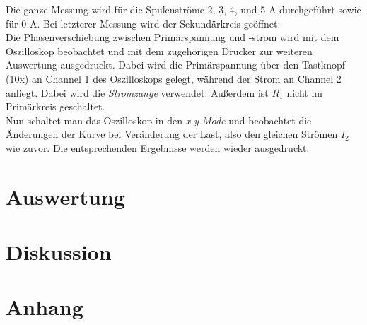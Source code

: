 \documentclass[12pt,a4paper,titlepage,headinclude,bibtotoc]{scrartcl}
\begin{document}
Die ganze Messung wird für die Spulenströme 2, 3, 4, und 5 A durchgeführt sowie für 0 A.
Bei letzterer Messung wird der Sekundärkreis geöffnet.\\
Die Phasenverschiebung zwischen Primärspannung und -strom wird mit dem Oszilloskop beobachtet und mit dem zugehörigen Drucker zur weiteren Auswertung ausgedruckt.
Dabei wird die Primärspannung über den Tastknopf (10x) an Channel 1 des Oszilloskops gelegt, während der Strom an Channel 2 anliegt.
Dabei wird die \emph{Stromzange} verwendet.
Außerdem ist $R_1$ nicht im Primärkreis geschaltet.\\
Nun schaltet man das Oszilloskop in den \emph{x-y-Mode} und beobachtet die Änderungen der Kurve bei Veränderung der Last, also den gleichen Strömen $I_2$ wie zuvor.
Die entsprechenden Ergebnisse werden wieder ausgedruckt.

\section{Auswertung}
\label{sec:auswertung}


\section{Diskussion}
\label{sec:diskussion}

\section{Anhang}
\end{document}

